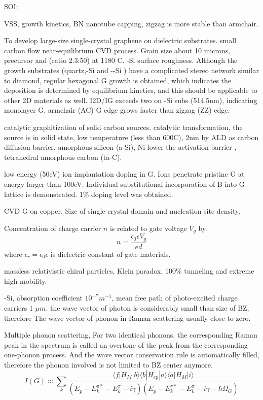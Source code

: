 SOI:

VSS, growth kinetics,
BN nanotube capping, zigzag is more stable than armchair. \cite{Menon1999}


\cite{Chen2013j} To develop large-size single-crystal graphene on dielectric substrates. small carbon flow near-equilibrium CVD process. Grain size about 10 microns, precursor  and  (ratio 2.3:50) at 1180 C. -Si surface roughness. Although the growth substrates (quartz,-Si and --Si ) have a complicated stereo network similar to diamond, regular hexagonal G growth is obtained, which indicates the deposition is determined by equilibrium kinetics, and this should be applicable to other 2D materials as well. I2D/IG exceeds two on -Si subs (514.5nm), indicating monolayer G. armchair (AC) G edge grows faster than zigzag (ZZ) edge.

\cite{Weatherup2013} catalytic graphitization of solid carbon sources. catalytic transformation, the source is in solid state, low temperature (less than 600C), 2nm   by ALD as carbon diffusion barrier. amorphous silicon (a-Si), Ni lower the activation barrier ,  tetrahedral amorphous carbon (ta-C).

\cite{Bangert2013} low energy (50eV) ion implantation doping in G. Ions penetrate pristine G at energy larger than 100eV. Individual substitutional incorporation of B into G lattice is demonstrated. 1\% doping level was obtained.


\cite{Wu2013b} CVD G on copper. Size of single crystal domain and nucleation site density.

Concentration of charge carrier $n$ is related to gate voltage $V_g$ by:
\[
n = \frac{\epsilon_0 \epsilon V_g}{ed}
\]
where $\epsilon_r = \epsilon_0 \epsilon$ is dielectric constant of gate materials.

massless relativistic chiral particles, Klein paradox, 100\% tunneling and extreme high mobility.

-Si,  absorption coefficient $10^{-7}m^{-1}$, mean free path of photo-excited charge carriers 1 $\mu m$. the wave vector of photon is considerably small than size of BZ, therefore The wave vector of phonon in Raman scattering usually close to zero.

Multiple phonon scattering, For two identical phonons, the corresponding Raman peak in the spectrum is called an overtone of the peak from the corresponding one-phonon process. And the wave vector conservation rule is automatically filled, therefore the phonon involved is not limited to BZ center anymore.
\[
I(G) \approx \sum_k \frac{\langle f|H_M|b\rangle \langle b|H_{ep}|a\rangle \langle a|H_M|i\rangle}{(E_p - E_k^{\pi *}- E_k^{\pi}-i\gamma)(E_p - E_k^{\pi *}- E_k^{\pi}-i\gamma- \hbar\Omega_{G})}
\]

